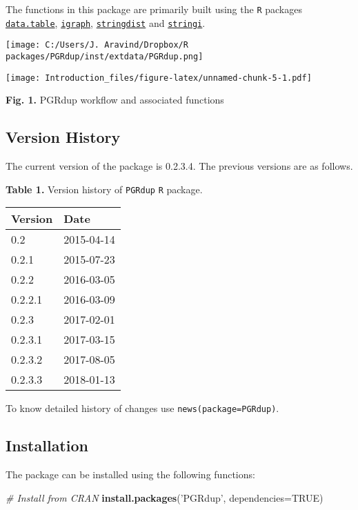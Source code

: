 \documentclass[]{article}
\newenvironment{Shaded}{\begin{snugshade}}{\end{snugshade}}
\newcommand{\CommentTok}[1]{\textcolor[rgb]{0.56,0.35,0.01}{\textit{#1}}}
\newcommand{\DataTypeTok}[1]{\textcolor[rgb]{0.13,0.29,0.53}{#1}}
\newcommand{\KeywordTok}[1]{\textcolor[rgb]{0.13,0.29,0.53}{\textbf{#1}}}
\newcommand{\NormalTok}[1]{#1}
\newcommand{\OtherTok}[1]{\textcolor[rgb]{0.56,0.35,0.01}{#1}}
\newcommand{\StringTok}[1]{\textcolor[rgb]{0.31,0.60,0.02}{#1}}
\begin{document}
The functions in this package are primarily built using the \texttt{R}
packages
\href{https://CRAN.R-project.org/package=data.table}{\texttt{data.table}},
\href{https://CRAN.R-project.org/package=igraph}{\texttt{igraph}},
\href{https://CRAN.R-project.org/package=stringdist}{\texttt{stringdist}}
and \href{https://CRAN.R-project.org/package=stringi}{\texttt{stringi}}.

\clearpage
\pagebreak

\begin{center}
    \texttt{[image: C:/Users/J. Aravind/Dropbox/R packages/PGRdup/inst/extdata/PGRdup.png]}
\end{center}

\texttt{[image: Introduction\_files/figure-latex/unnamed-chunk-5-1.pdf]}

\textbf{Fig. 1.} PGRdup workflow and associated functions

\hypertarget{version-history}{%
\subsection{Version History}\label{version-history}}

The current version of the package is 0.2.3.4. The previous versions are
as follows.

\textbf{Table 1.} Version history of \texttt{PGRdup} \texttt{R} package.

\begin{longtable}[]{@{}ll@{}}
\toprule
Version & Date\tabularnewline
\midrule
\endhead
0.2 & 2015-04-14\tabularnewline
0.2.1 & 2015-07-23\tabularnewline
0.2.2 & 2016-03-05\tabularnewline
0.2.2.1 & 2016-03-09\tabularnewline
0.2.3 & 2017-02-01\tabularnewline
0.2.3.1 & 2017-03-15\tabularnewline
0.2.3.2 & 2017-08-05\tabularnewline
0.2.3.3 & 2018-01-13\tabularnewline
\bottomrule
\end{longtable}

To know detailed history of changes use
\texttt{news(package=\textquotesingle{}PGRdup\textquotesingle{})}.

\pagebreak

\hypertarget{installation}{%
\subsection{Installation}\label{installation}}

The package can be installed using the following functions:

\begin{Shaded}
\begin{Highlighting}[]
\CommentTok{# Install from CRAN}
\KeywordTok{install.packages}\NormalTok{(}\StringTok{'PGRdup'}\NormalTok{, }\DataTypeTok{dependencies=}\OtherTok{TRUE}\NormalTok{)}
\end{Highlighting}
\end{Shaded}
\end{document}
